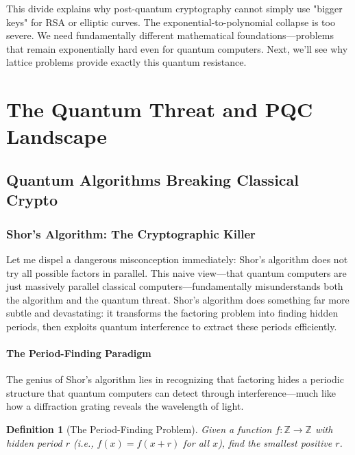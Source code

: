 \documentclass[11pt,a4paper]{article}
\newtheorem{definition}{Definition}
\begin{document}
This divide explains why post-quantum cryptography cannot simply use "bigger keys" for RSA or elliptic curves. The exponential-to-polynomial collapse is too severe. We need fundamentally different mathematical foundations---problems that remain exponentially hard even for quantum computers. Next, we'll see why lattice problems provide exactly this quantum resistance.

\section{The Quantum Threat and PQC Landscape}
\label{sec:quantum-threat}

\subsection{Quantum Algorithms Breaking Classical Crypto}
\label{sec:quantum-algorithms}

\subsubsection{Shor's Algorithm: The Cryptographic Killer}

Let me dispel a dangerous misconception immediately: Shor's algorithm does not try all possible factors in parallel. This naive view---that quantum computers are just massively parallel classical computers---fundamentally misunderstands both the algorithm and the quantum threat. Shor's algorithm does something far more subtle and devastating: it transforms the factoring problem into finding hidden periods, then exploits quantum interference to extract these periods efficiently.

\paragraph{The Period-Finding Paradigm}

The genius of Shor's algorithm lies in recognizing that factoring hides a periodic structure that quantum computers can detect through interference---much like how a diffraction grating reveals the wavelength of light.

\begin{definition}[The Period-Finding Problem]
Given a function $f: \mathbb{Z} \to \mathbb{Z}$ with hidden period $r$ (i.e., $f(x) = f(x+r)$ for all $x$), find the smallest positive $r$.
\end{definition}
\end{document}
